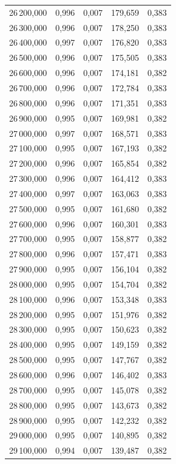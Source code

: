 \begin{longtable}{rrrrr}
26\,200,000 & 0,996 & 0,007 & 179,659 & 0,383\\
26\,300,000 & 0,996 & 0,007 & 178,250 & 0,383\\
26\,400,000 & 0,997 & 0,007 & 176,820 & 0,383\\
26\,500,000 & 0,996 & 0,007 & 175,505 & 0,383\\
26\,600,000 & 0,996 & 0,007 & 174,181 & 0,382\\
26\,700,000 & 0,996 & 0,007 & 172,784 & 0,383\\
26\,800,000 & 0,996 & 0,007 & 171,351 & 0,383\\
26\,900,000 & 0,995 & 0,007 & 169,981 & 0,382\\
27\,000,000 & 0,997 & 0,007 & 168,571 & 0,383\\
27\,100,000 & 0,995 & 0,007 & 167,193 & 0,382\\
27\,200,000 & 0,996 & 0,007 & 165,854 & 0,382\\
27\,300,000 & 0,996 & 0,007 & 164,412 & 0,383\\
27\,400,000 & 0,997 & 0,007 & 163,063 & 0,383\\
27\,500,000 & 0,995 & 0,007 & 161,680 & 0,382\\
27\,600,000 & 0,996 & 0,007 & 160,301 & 0,383\\
27\,700,000 & 0,995 & 0,007 & 158,877 & 0,382\\
27\,800,000 & 0,996 & 0,007 & 157,471 & 0,383\\
27\,900,000 & 0,995 & 0,007 & 156,104 & 0,382\\
28\,000,000 & 0,995 & 0,007 & 154,704 & 0,382\\
28\,100,000 & 0,996 & 0,007 & 153,348 & 0,383\\
28\,200,000 & 0,995 & 0,007 & 151,976 & 0,382\\
28\,300,000 & 0,995 & 0,007 & 150,623 & 0,382\\
28\,400,000 & 0,995 & 0,007 & 149,159 & 0,382\\
28\,500,000 & 0,995 & 0,007 & 147,767 & 0,382\\
28\,600,000 & 0,996 & 0,007 & 146,402 & 0,383\\
28\,700,000 & 0,995 & 0,007 & 145,078 & 0,382\\
28\,800,000 & 0,995 & 0,007 & 143,673 & 0,382\\
28\,900,000 & 0,995 & 0,007 & 142,232 & 0,382\\
29\,000,000 & 0,995 & 0,007 & 140,895 & 0,382\\
29\,100,000 & 0,994 & 0,007 & 139,487 & 0,382\\

\end{longtable}
